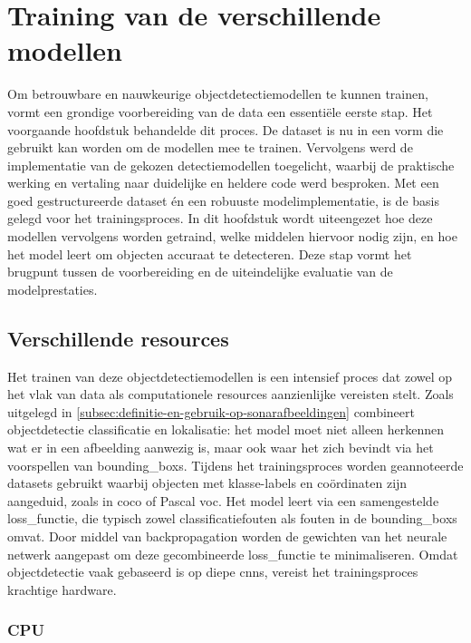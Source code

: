 \chapter{Training van de verschillende modellen}
\label{ch:training-optimalisatie}

Om betrouwbare en nauwkeurige objectdetectiemodellen te kunnen trainen, vormt een grondige voorbereiding van de data een essentiële eerste stap. Het voorgaande hoofdstuk behandelde dit proces. De dataset is nu in een vorm die gebruikt kan worden om de modellen mee te trainen. Vervolgens werd de implementatie van de gekozen detectiemodellen toegelicht, waarbij de praktische werking en vertaling naar duidelijke en heldere code werd besproken. Met een goed gestructureerde dataset én een robuuste modelimplementatie, is de basis gelegd voor het trainingsproces. In dit hoofdstuk wordt uiteengezet hoe deze modellen vervolgens worden getraind, welke middelen hiervoor nodig zijn, en hoe het model leert om objecten accuraat te detecteren. Deze stap vormt het brugpunt tussen de voorbereiding en de uiteindelijke evaluatie van de modelprestaties. \\

\section{Verschillende resources}

Het trainen van deze objectdetectiemodellen is een intensief proces dat zowel op het vlak van data als computationele resources aanzienlijke vereisten stelt. Zoals uitgelegd in \ref{subsec:definitie-en-gebruik-op-sonarafbeeldingen} combineert objectdetectie classificatie en lokalisatie: het model moet niet alleen herkennen wat er in een afbeelding aanwezig is, maar ook waar het zich bevindt via het voorspellen van \glspl{bounding_box}. Tijdens het trainingsproces worden geannoteerde datasets gebruikt waarbij objecten met klasse-labels en coördinaten zijn aangeduid, zoals in \gls{coco} of Pascal \gls{voc}. Het model leert via een samengestelde \gls{loss_functie}, die typisch zowel classificatiefouten als fouten in de \glspl{bounding_box} omvat. Door middel van \gls{backpropagation} worden de gewichten van het neurale netwerk aangepast om deze gecombineerde \gls{loss_functie} te minimaliseren. Omdat objectdetectie vaak gebaseerd is op diepe \glspl{cnn}, vereist het trainingsproces krachtige hardware. \\

\subsection{CPU}

